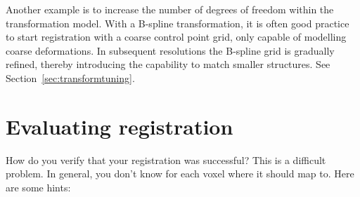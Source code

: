 \documentclass[]{report}
\begin{document}
Another example is to increase the number of degrees of freedom
within the transformation model. With a B-spline transformation,
it is often good practice to start registration with a coarse
control point grid, only capable of modelling coarse deformations.
In subsequent resolutions the B-spline grid is gradually refined,
thereby introducing the capability to match smaller structures.
See Section~\ref{sec:transformtuning}.

\section{Evaluating registration}\label{sec:evaluation}

How do you verify that your registration was successful? This is a
difficult problem. In general, you don't know for each voxel where
it should map to. Here are some hints:
\end{document}

